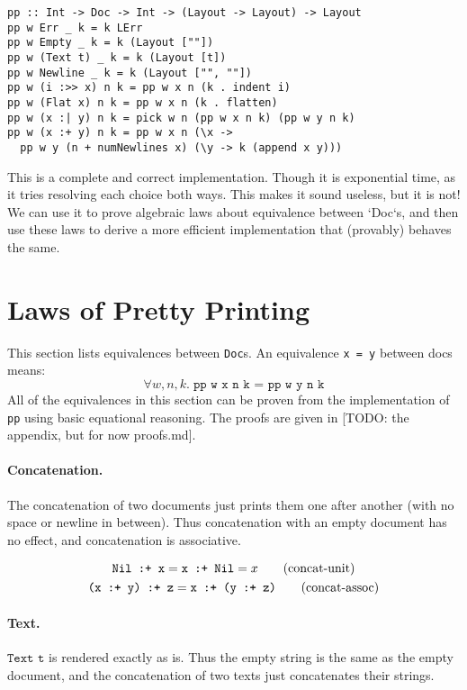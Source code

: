 \documentclass{article}
\newcommand{\cat}[2]{\texttt{#1 :+ #2}}
\newcommand{\txt}[1]{\texttt{Text #1}}
\newcommand{\nil}{\texttt{Nil}}
\begin{document}
\begin{lstlisting}
pp :: Int -> Doc -> Int -> (Layout -> Layout) -> Layout
pp w Err _ k = k LErr
pp w Empty _ k = k (Layout [""])
pp w (Text t) _ k = k (Layout [t])
pp w Newline _ k = k (Layout ["", ""])
pp w (i :>> x) n k = pp w x n (k . indent i)
pp w (Flat x) n k = pp w x n (k . flatten)
pp w (x :| y) n k = pick w n (pp w x n k) (pp w y n k)
pp w (x :+ y) n k = pp w x n (\x ->
  pp w y (n + numNewlines x) (\y -> k (append x y)))
\end{lstlisting}

This is a complete and correct implementation. Though it is exponential time, as it tries resolving
each choice both ways. This makes it sound useless, but it is not! We can use it to prove algebraic
laws about equivalence between `Doc`s, and then use these laws to derive a more efficient
implementation that (provably) behaves the same.

\section{Laws of Pretty Printing}

This section lists equivalences between \texttt{Doc}s. An equivalence \texttt{x = y} between docs
means:
\[ \forall w, n, k.\; \texttt{pp w x n k = pp w y n k} \]
All of the equivalences in this section can be proven from the implementation of \texttt{pp} using
basic equational reasoning. The proofs are given in [TODO: the appendix, but for now proofs.md].

\paragraph{Concatenation.}
The concatenation of two documents just prints them one after another (with no space or newline in
between). Thus concatenation with an empty document has no effect, and concatenation is associative.

\begin{gather*}
  \cat{\nil}{x} = \cat{x}{\nil} = x \tag{concat-unit} \\
  \cat{(\cat{x}{y})}{z} = \cat{x}{(\cat{y}{z})} \tag{concat-assoc}
\end{gather*}

\paragraph{Text.}
$\txt{t}$ is rendered exactly as is. Thus the empty string is the same as the empty document, and
the concatenation of two texts just concatenates their strings.
\end{document}
